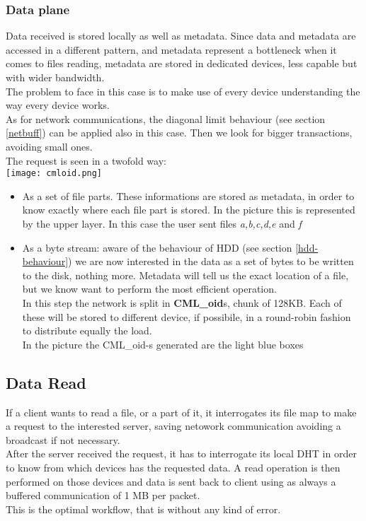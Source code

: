 \subsubsection*{Data plane}
Data received is stored locally as well as metadata. Since data and metadata
are accessed in a different pattern, and metadata represent a bottleneck when
it comes to files reading, metadata are stored in dedicated devices, less
capable but with wider bandwidth. \\
The problem to face in this case is to make use of every device understanding
the way every device works. \\
As for network communications, the diagonal limit behaviour (see section
\ref{netbuff}) can be applied also in this case. Then we look for bigger
transactions, avoiding small ones. \\
The request is seen in a twofold way: \\
\texttt{[image: cmloid.png]}
\begin{itemize}
    \item As a set of file parts. These informations are stored as metadata, in
        order to know exactly where each file part is stored. In the picture
        this is represented by the upper layer. In this case the user sent files
        \textit{a,b,c,d,e} and \textit{f}
    \item As a byte stream: aware of the behaviour of HDD (see section
        \ref{hdd-behaviour}) we are now interested in the data as a set of bytes
        to be written to the disk, nothing more. Metadata will tell us the exact
        location of a file, but we know want to perform the most efficient
        operation. \\
        In this step the network is split in \textbf{CML\_oid}s, chunk of 128KB.
        Each of these will be stored to different device, if possibile, in a
        round-robin fashion to distribute equally the load. \\
        In the picture the CML\_oid-s generated are the light blue boxes
\end{itemize}

\subsection{Data Read}
If a client wants to read a file, or a part of it, it interrogates its file map
to make a request to the interested server, saving netowork communication
avoiding a broadcast if not necessary. \\
After the server received the request, it has to interrogate its local DHT in
order to know from which devices has the requested data. A read operation is
then performed on those devices and data is sent back to client using as always
a buffered communication of 1 MB per packet. \\
This is the optimal workflow, that is without any kind of error.


